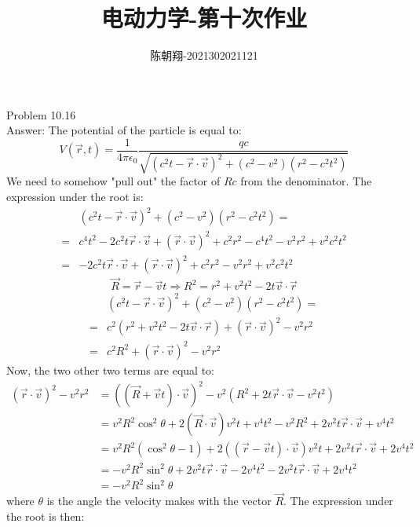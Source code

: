 \documentclass[UTF8]{ctexart}
\title{电动力学-第十次作业}
\author{陈朝翔-2021302021121}
\begin{document}
	\maketitle
	Problem 10.16\\
	Answer:
	The potential of the particle is equal to:
	$$V(\vec{r}, t)=\frac{1}{4 \pi \epsilon_{0}} \frac{q c}{\sqrt{\left(c^{2} t-\vec{r} \cdot \vec{v}\right)^{2}+\left(c^{2}-v^{2}\right)\left(r^{2}-c^{2} t^{2}\right)}} $$
	We need to somehow "pull out" the factor of $R c$ from the denominator. The expression under the root is:
	$$\begin{aligned}
		&\left(c^{2} t-\vec{r} \cdot \vec{v}\right)^{2}+\left(c^{2}-v^{2}\right)\left(r^{2}-c^{2} t^{2}\right)=\\
		=&c^{4} t^{2}-2 c^{2} t \vec{r} \cdot \vec{v}+(\vec{r} \cdot \vec{v})^{2}+c^{2} r^{2}-c^{4} t^{2}-v^{2} r^{2}+v^{2} c^{2} t^{2} \\
		=&-2 c^{2} t \vec{r} \cdot \vec{v}+(\vec{r} \cdot \vec{v})^{2}+c^{2} r^{2}-v^{2} r^{2}+v^{2} c^{2} t^{2}
	\end{aligned}$$
	$$\vec{R}=\vec{r}-\vec{v} t \Longrightarrow R^{2}=r^{2}+v^{2} t^{2}-2 t \vec{v} \cdot \vec{r}$$
	$$\begin{aligned}
	&\left(c^{2} t-\vec{r} \cdot \vec{v}\right)^{2}+\left(c^{2}-v^{2}\right)\left(r^{2}-c^{2} t^{2}\right)=\\
	=& c^{2}\left(r^{2}+v^{2} t^{2}-2 t \vec{v} \cdot \vec{r}\right)+(\vec{r} \cdot \vec{v})^{2}-v^{2} r^{2} \\
	=& c^{2} R^{2}+(\vec{r} \cdot \vec{v})^{2}-v^{2} r^{2}
	\end{aligned}$$
	Now, the two other two terms are equal to:
	$$\begin{aligned}
	(\vec{r} \cdot \vec{v})^{2}-v^{2} r^{2} &=((\vec{R}+\vec{v} t) \cdot \vec{v})^{2}-v^{2}\left(R^{2}+2 t \vec{r} \cdot \vec{v}-v^{2} t^{2}\right) \\
	&=v^{2} R^{2} \cos ^{2} \theta+2(\vec{R} \cdot \vec{v}) v^{2} t+v^{4} t^{2}-v^{2} R^{2}+2 v^{2} t \vec{r} \cdot \vec{v}+v^{4} t^{2} \\
	&=v^{2} R^{2}\left(\cos ^{2} \theta-1\right)+2((\vec{r}-\vec{v} t) \cdot \vec{v}) v^{2} t+2 v^{2} t \vec{r} \cdot \vec{v}+2 v^{4} t^{2} \\
	&=-v^{2} R^{2} \sin ^{2} \theta+2 v^{2} t \vec{r} \cdot \vec{v}-2 v^{4} t^{2}-2 v^{2} t \vec{r} \cdot \vec{v}+2 v^{4} t^{2} \\
	&=-v^{2} R^{2} \sin ^{2} \theta
	\end{aligned}$$
	where $\theta$ is the angle the velocity makes with the vector $\vec{R}$. The expression under the root is then:
\end{document}
